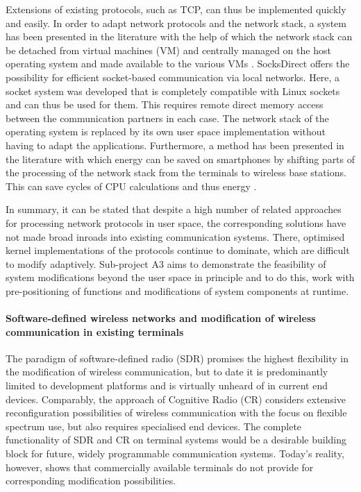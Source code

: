 Extensions of existing protocols, such as TCP, can thus be implemented quickly and easily.
In order to adapt network protocols and the network stack, a system has been presented in the literature with the help of which the network stack can be detached from virtual machines (VM) and centrally managed on the host operating system and made available to the various VMs \cite{A3:niu2019netkernel}. 
SocksDirect \cite{A3:li2019socksdirect} offers the possibility for efficient socket-based communication via local networks. 
Here, a socket system was developed that is completely compatible with Linux sockets and can thus be used for them. 
This requires remote direct memory access between the communication partners in each case. 
The network stack of the operating system is replaced by its own user space implementation without having to adapt the applications. 
Furthermore, a method has been presented in the literature with which energy can be saved on smartphones by shifting parts of the processing of the network stack from the terminals to wireless base stations.
This can save cycles of CPU calculations and thus energy \cite{A3:zhu2016trimming}. 

In summary, it can be stated that despite a high number of related approaches for processing network protocols in user space, the corresponding solutions have not made broad inroads into existing communication systems. There, optimised kernel implementations of the protocols continue to dominate, which are difficult to modify adaptively. Sub-project A3 aims to demonstrate the feasibility of system modifications beyond the user space in principle and to do this, work with pre-positioning of functions and modifications of system components at runtime.



\paragraph{Software-defined wireless networks and modification of wireless communication in existing terminals}
The paradigm of software-defined radio (SDR) promises the highest flexibility in the modification of wireless communication, but to date it is predominantly limited to development platforms and is virtually unheard of in current end devices. Comparably, the approach of Cognitive Radio (CR) considers extensive reconfiguration possibilities of wireless communication with the focus on flexible spectrum use, but also requires specialised end devices. The complete functionality of SDR and CR on terminal systems would be a desirable building block for future, widely programmable communication systems. Today's reality, however, shows that commercially available terminals do not provide for corresponding modification possibilities. 

